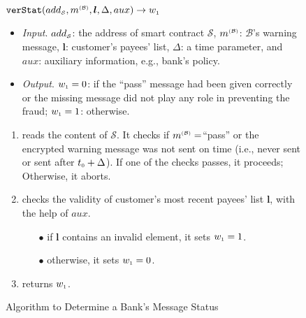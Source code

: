 %
%
 \vspace{-2.5mm}
\begin{figure}[!htbp]
\setlength{\fboxsep}{1pt}
\begin{center}
    \begin{tcolorbox}[enhanced,width=5.5in, height=42mm,
    drop fuzzy shadow southwest,
    colframe=black,colback=white]
{\small{
    \vspace{-2.6mm}
\underline{$\mathtt{verStat}(add_{\scriptscriptstyle\mathcal{S}}, m^{\scriptscriptstyle\mathcal{(B)}},  \bm l, \Delta, aux)\rightarrow w_{\scriptscriptstyle 1}$}\\
%
\vspace{-2.5mm}
\begin{itemize}
\item\noindent\textit{Input}. $add_{\scriptscriptstyle\mathcal{S}}$: the address of smart contract $\mathcal{S}$, $m^{\scriptscriptstyle\mathcal{(B)}}$:  $\mathcal{B}$'s warning message,  $\bm l$:  customer's payees' list, $\Delta$: a time parameter, and $aux$: auxiliary information, e.g., bank's policy. 
%
\item\noindent\textit{Output}. $ w_{\scriptscriptstyle 1}=0$: if the ``pass'' message had been given correctly or the missing message did not play any role in preventing the fraud; $ w_{\scriptscriptstyle 1}=1$: otherwise. 
\end{itemize}
\begin{enumerate}
\item reads the content of   $\mathcal{S}$. It checks if $m^{\scriptscriptstyle\mathcal{(B)}}=$``pass''  or the encrypted warning message was not sent on time (i.e., never sent or sent after    $t_{\scriptscriptstyle 0}+\Delta$).  If one of the checks passes, it proceeds; Otherwise, it aborts. 
\item checks the validity of  customer's most recent payees' list $\bm l$, with the help of  $aux$. 
\begin{itemize}
\item[$\bullet$]  if $\bm l$ contains an invalid element,  it sets $ w_{\scriptscriptstyle 1}=1$.
\item [$\bullet$] otherwise, it sets $ w_{\scriptscriptstyle 1}=0$.
\end{itemize}
\item returns $ w_{\scriptscriptstyle 1}$.
\vspace{-1.4mm}
\end{enumerate}
}}
\end{tcolorbox}
\end{center}
\vspace{-3.2mm}
\caption{Algorithm to Determine a Bank's Message Status} 
\label{fig:verStat}
\end{figure}





